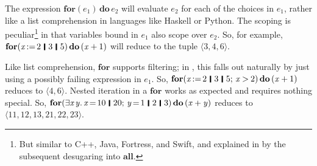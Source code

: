 \documentclass[acmsmall]{acmart}
\newcommand{\Varid}[1]{\mathit{#1}}
\begin{document}
The expression \ensuremath{\textbf{for}(\Varid{e}_{\mathrm{1}})\,\textbf{do}\,\Varid{e}_{\mathrm{2}}} will evaluate \ensuremath{\Varid{e}_{\mathrm{2}}} for each of the choices in \ensuremath{\Varid{e}_{\mathrm{1}}},
rather like a list comprehension in languages like Haskell or Python.
The scoping is peculiar\footnote{But similar to C++, Java, Fortress, and Swift, and explained in \versecalc{} by
  the subsequent desugaring into \ensuremath{\textbf{all}}.}
in that variables bound in \ensuremath{\Varid{e}_{\mathrm{1}}} also scope over \ensuremath{\Varid{e}_{\mathrm{2}}}.
So, for example, \ensuremath{\textbf{for}(\Varid{x}\hspace{-0.14em}:=\hspace{-0.14em}\mathrm{2}\hspace{0.2em}\mathop{\rule[-0.1em]{0.15em}{0.75em}}\hspace{0.2em}\mathrm{3}\hspace{0.2em}\mathop{\rule[-0.1em]{0.15em}{0.75em}}\hspace{0.2em}\mathrm{5})\,\textbf{do}\,(\Varid{x}\mathbin{+}\mathrm{1})} will reduce to the tuple \ensuremath{\langle{}\mathrm{3},\mathrm{4},\mathrm{6}\rangle}.

Like list comprehension, \ensuremath{\textbf{for}} supports filtering; in \versecalc{}, this falls out naturally by just using
a possibly failing expression in \ensuremath{\Varid{e}_{\mathrm{1}}}.
So, \ensuremath{\textbf{for}(\Varid{x}\hspace{-0.14em}:=\hspace{-0.14em}\mathrm{2}\hspace{0.2em}\mathop{\rule[-0.1em]{0.15em}{0.75em}}\hspace{0.2em}\mathrm{3}\hspace{0.2em}\mathop{\rule[-0.1em]{0.15em}{0.75em}}\hspace{0.2em}\mathrm{5};\,\Varid{x}\mathbin{>}\mathrm{2})\,\textbf{do}\,(\Varid{x}\mathbin{+}\mathrm{1})} reduces to \ensuremath{\langle{}\mathrm{4},\mathrm{6}\rangle}.
Nested iteration in a \ensuremath{\textbf{for}} works as expected and requires nothing special.
So, \ensuremath{\textbf{for}(\exists\Varid{x}\hspace{0.1em}\Varid{y}.\,\Varid{x}\hspace{-0.14em}=\hspace{-0.14em}\mathrm{10}\hspace{0.2em}\mathop{\rule[-0.1em]{0.15em}{0.75em}}\hspace{0.2em}\mathrm{20};\,\Varid{y}\hspace{-0.14em}=\hspace{-0.14em}\mathrm{1}\hspace{0.2em}\mathop{\rule[-0.1em]{0.15em}{0.75em}}\hspace{0.2em}\mathrm{2}\hspace{0.2em}\mathop{\rule[-0.1em]{0.15em}{0.75em}}\hspace{0.2em}\mathrm{3})\,\textbf{do}\,(\Varid{x}\mathbin{+}\Varid{y})} reduces to \ensuremath{\langle{}\mathrm{11},\mathrm{12},\mathrm{13},\mathrm{21},\mathrm{22},\mathrm{23}\rangle}.
\end{document}
